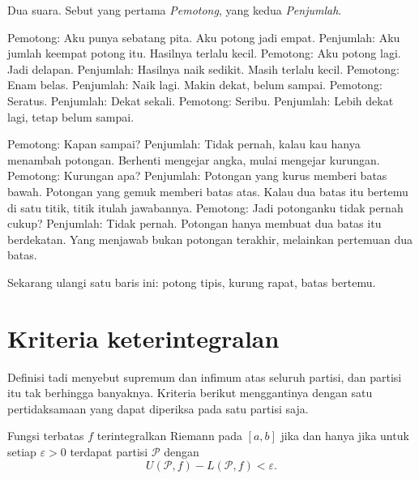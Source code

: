 

\begin{bacakeras}
Dua suara. Sebut yang pertama \emph{Pemotong}, yang kedua \emph{Penjumlah}.

Pemotong: Aku punya sebatang pita. Aku potong jadi empat.
Penjumlah: Aku jumlah keempat potong itu. Hasilnya terlalu kecil.
Pemotong: Aku potong lagi. Jadi delapan.
Penjumlah: Hasilnya naik sedikit. Masih terlalu kecil.
Pemotong: Enam belas.
Penjumlah: Naik lagi. Makin dekat, belum sampai.
Pemotong: Seratus.
Penjumlah: Dekat sekali.
Pemotong: Seribu.
Penjumlah: Lebih dekat lagi, tetap belum sampai.

Pemotong: Kapan sampai?
Penjumlah: Tidak pernah, kalau kau hanya menambah potongan. Berhenti mengejar angka,
mulai mengejar kurungan.
Pemotong: Kurungan apa?
Penjumlah: Potongan yang kurus memberi batas bawah. Potongan yang gemuk memberi batas
atas. Kalau dua batas itu bertemu di satu titik, titik itulah jawabannya.
Pemotong: Jadi potonganku tidak pernah cukup?
Penjumlah: Tidak pernah. Potongan hanya membuat dua batas itu berdekatan. Yang menjawab
bukan potongan terakhir, melainkan pertemuan dua batas.

Sekarang ulangi satu baris ini: potong tipis, kurung rapat, batas bertemu.
\end{bacakeras}

\section{Kriteria keterintegralan}

Definisi tadi menyebut supremum dan infimum atas seluruh partisi, dan partisi itu tak
berhingga banyaknya. Kriteria berikut menggantinya dengan satu pertidaksamaan yang
dapat diperiksa pada satu partisi saja.

\begin{teorema}
Fungsi terbatas $f$ terintegralkan Riemann pada $[a,b]$ jika dan hanya jika untuk
setiap $\varepsilon>0$ terdapat partisi $\mathcal{P}$ dengan
\[
U(\mathcal{P},f)-L(\mathcal{P},f)<\varepsilon .
\]
\end{teorema}


